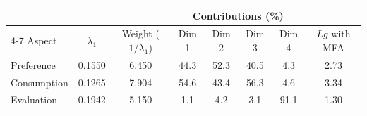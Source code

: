 \begin{tabular}{lccccccc}
\toprule
 & & & \multicolumn{4}{c}{Contributions (\%)} & \\
\cmidrule(lr){4-7}
Aspect & $\lambda_1$ & Weight ($1/\lambda_1$) & Dim 1 & Dim 2 & Dim 3 & Dim 4 & $Lg$ with MFA \\
\midrule
Preference & 0.1550 & 6.450 & 44.3 & 52.3 & 40.5 & 4.3 & 2.73 \\
Consumption & 0.1265 & 7.904 & 54.6 & 43.4 & 56.3 & 4.6 & 3.34 \\
Evaluation & 0.1942 & 5.150 & 1.1 & 4.2 & 3.1 & 91.1 & 1.30 \\
\bottomrule
\end{tabular}
